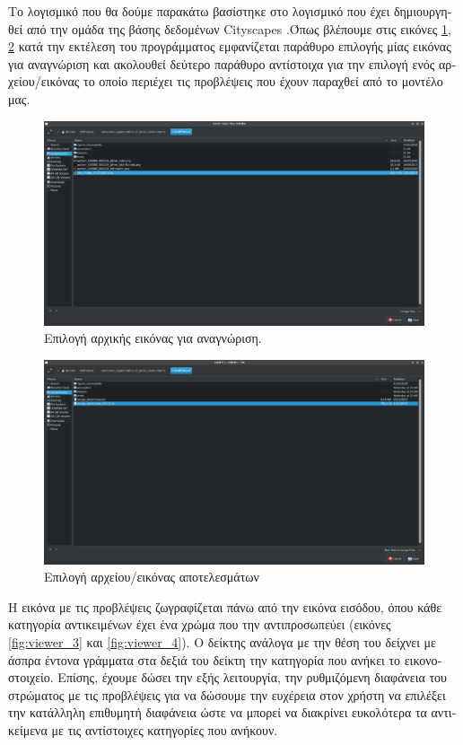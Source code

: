 \textgreek{Το λογισμικό που θα δούμε παρακάτω βασίστηκε στο λογισμικό που έχει δημιουργηθεί από την ομάδα της βάσης δεδομένων }Cityscapes \cite{Cityscapes}.\textgreek{Όπως βλέπουμε στις εικόνες} \ref{fig:viewer_1}, \ref{fig:viewer_2} \textgreek{κατά την εκτέλεση του  προγράμματος εμφανίζεται παράθυρο επιλογής μίας εικόνας για αναγνώριση και ακολουθεί δεύτερο παράθυρο αντίστοιχα για την επιλογή ενός αρχείου/εικόνας το οποίο περιέχει τις προβλέψεις που έχουν παραχθεί από το μοντέλο μας. }
\begin{figure}[H]
 \centering
 \includegraphics[width=\textwidth, scale=0.3]{Images/viewer_1}
\caption[\textgreek{Επιλογή Εικόνας}]{\textgreek{Επιλογή αρχικής εικόνας για αναγνώριση.}}\label{fig:viewer_1}
\end{figure}

\begin{figure}[H]
 \centering
 \includegraphics[width=\textwidth, scale=0.3]{Images/viewer_2}
\caption[\textgreek{Επιλογή Αρχείου}]{\textgreek{Επιλογή αρχείου/εικόνας αποτελεσμάτων}}\label{fig:viewer_2}
\end{figure}

\textgreek{Η εικόνα με τις προβλέψεις ζωγραφίζεται πάνω από την εικόνα εισόδου, όπου κάθε κατηγορία αντικειμένων έχει ένα χρώμα που την αντιπροσωπεύει (εικόνες} \ref{fig:viewer_3}\textgreek{ και} \ref{fig:viewer_4}). \textgreek{Ο δείκτης ανάλογα με την θέση του δείχνει με άσπρα έντονα γράμματα στα δεξιά του δείκτη την κατηγορία που ανήκει το εικονοστοιχείο. Επίσης, έχουμε δώσει την εξής λειτουργία, την ρυθμιζόμενη διαφάνεια του στρώματος με τις προβλέψεις για να δώσουμε την ευχέρεια στον χρήστη να επιλέξει την κατάλληλη επιθυμητή διαφάνεια ώστε να μπορεί να διακρίνει ευκολότερα τα αντικείμενα με τις αντίστοιχες κατηγορίες που ανήκουν.}

